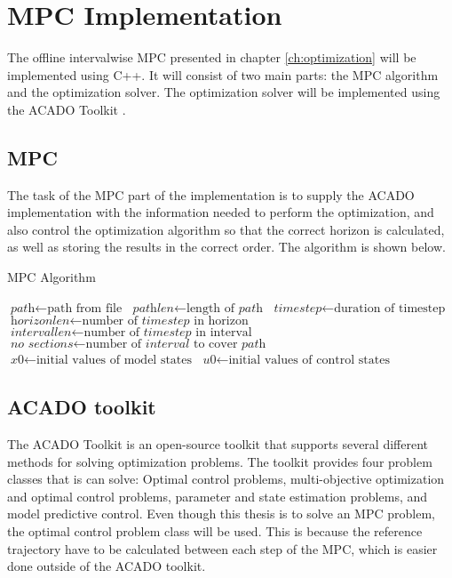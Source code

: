 \chapter{MPC Implementation}

The offline intervalwise MPC presented in chapter \ref{ch:optimization} will be implemented using C++. It will consist of two main parts: the MPC algorithm and the optimization solver. The optimization solver will be implemented using the ACADO Toolkit \cite{acadoHOUSKA}.


\section{MPC}

The task of the MPC part of the implementation is to supply the ACADO implementation with the information needed to perform the optimization, and also control the optimization algorithm so that the correct horizon is calculated, as well as storing the results in the correct order. The algorithm is shown below.

\begin{algorithm}
\caption{MPC Algorithm}
\begin{algorithmic}[1]
	\State $\textit{path} \gets \text{path from file}$
	\State $\textit{pathlen} \gets \text{length of } \textit{path}$
	\State $\textit{timestep} \gets \text{duration of timestep}$
	\State $\textit{horizonlen} \gets \text{number of } \textit{timestep} \text{ in horizon}$
	\State $\textit{intervallen} \gets \text{number of } \textit{timestep} \text{ in interval}$
	\State $\textit{no sections} \gets \text{number of } \textit{interval} \text{ to cover } \textit{path}$
	\State $\textit{x0} \gets \text{initial values of model states}$
	\State $\textit{u0} \gets \text{initial values of control states}$
\EndProcedure
\end{algorithmic}
\end{algorithm}


\section{ACADO toolkit}

The ACADO Toolkit is an open-source toolkit that supports several different methods for solving optimization problems. The toolkit provides four problem classes that is can solve: Optimal control problems, multi-objective optimization and optimal control problems, parameter and state estimation problems, and model predictive control. Even though this thesis is to solve an MPC problem, the optimal control problem class will be used. This is because the reference trajectory have to be calculated between each step of the MPC, which is easier done outside of the ACADO toolkit.

